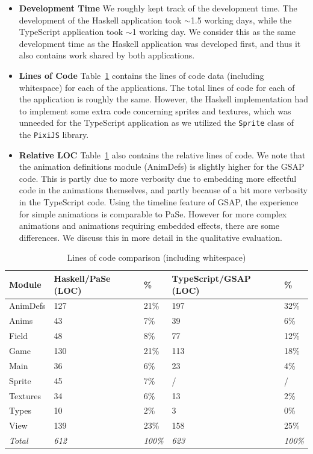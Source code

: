 \begin{itemize}
\item \textbf{Development Time} We roughly kept track of the development time. The development of the Haskell application took $\sim$1.5 working days, while the TypeScript application took $\sim$1 working day. We consider this as the same development time as the Haskell application was developed first, and thus it also contains work shared by both applications.
\item \textbf{Lines of Code} Table~\ref{tbl:loc} contains the lines of code data (including whitespace) for each of the applications. The total lines of code for each of the application is roughly the same. However, the Haskell implementation had to implement some extra code concerning sprites and textures, which was unneeded for the TypeScript application as we utilized the \texttt{Sprite} class of the \texttt{PixiJS} library.
\item \textbf{Relative LOC} Table~\ref{tbl:loc} also contains the relative lines of code. We note that the animation definitions module (AnimDefs) is slightly higher for the GSAP code. This is partly due to more verbosity due to embedding more effectful code in the animations themselves, and partly because of a bit more verbosity in the TypeScript code. Using the timeline feature of GSAP, the experience for simple animations is comparable to PaSe. However for more complex animations and animations requiring embedded effects, there are some differences. We discuss this in more detail in the qualitative evaluation.
\end{itemize}

\begin{table}
\caption{Lines of code comparison (including whitespace)}
\centering
\label{tbl:loc}
\begin{center}
\begin{tabular}{l@{\hskip 0.5cm}ll@{\hskip 0.2cm}ll}
 Module & Haskell/PaSe (LOC) & \% & TypeScript/GSAP (LOC) & \% \\
 \hline
 AnimDefs & 127 & 21\% & 197 & 32\% \\ 
 Anims & 43 & 7\% & 39 & 6\% \\  
 Field & 48 & 8\% & 77 & 12\% \\  
 Game & 130 & 21\% & 113 & 18\% \\  
 Main & 36 & 6\% & 23 & 4\% \\  
 Sprite & 45 & 7\% & / & / \\  
 Textures & 34 & 6\% & 13 & 2\% \\  
 Types & 10 & 2\% & 3 & 0\% \\  
 View & 139 & 23\% & 158 & 25\% \\
 \emph{Total} & \emph{612} & \emph{100\%} & \emph{623} & \emph{100\%}
\end{tabular}
\end{center}
\end{table}

